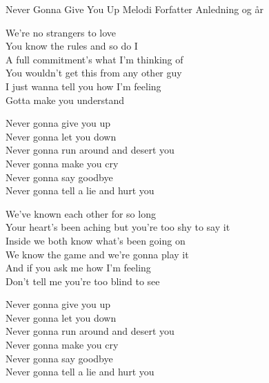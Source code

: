 \begin{song}{Never Gonna Give You Up}
  {} %
  {Melodi} %
  {Forfatter} %
  {Anledning og år} %
  {\NotCCLIed} %

  \begin{SBVerse}
    We're no strangers to love\\
    You know the rules and so do I\\
    A full commitment's what I'm thinking of\\
    You wouldn't get this from any other guy\\\medskip
    I just wanna tell you how I'm feeling\\
    Gotta make you understand
  \end{SBVerse}

  \begin{SBChorus}
    Never gonna give you up\\
    Never gonna let you down\\
    Never gonna run around and desert you\\
    Never gonna make you cry\\
    Never gonna say goodbye\\
    Never gonna tell a lie and hurt you
  \end{SBChorus}

  \begin{SBVerse}
    We've known each other for so long\\
    Your heart's been aching but you're too shy to say it\\
    Inside we both know what's been going on\\
    We know the game and we're gonna play it\\\medskip
    And if you ask me how I'm feeling\\
    Don't tell me you're too blind to see
  \end{SBVerse}

  \begin{SBChorus}
    Never gonna give you up\\
    Never gonna let you down\\
    Never gonna run around and desert you\\
    Never gonna make you cry\\
    Never gonna say goodbye\\
    Never gonna tell a lie and hurt you
  \end{SBChorus}


\end{song}
